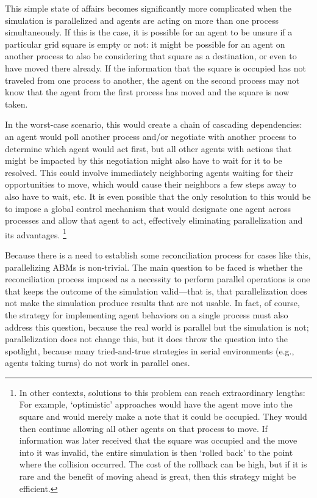 This simple state of affairs becomes significantly more complicated when the simulation is parallelized and agents are acting on more than one process simultaneously. If this is the case, it is possible for an agent to be unsure if a particular grid square is empty or not: it might be possible for an agent on another process to also be considering that square as a destination, or even to have moved there already. If the information that the square is occupied has not traveled from one process to another, the agent on the second process may not know that the agent from the first process has moved and the square is now taken.

In the worst-case scenario, this would create a chain of cascading dependencies: an agent would poll another process and/or negotiate with another process to determine which agent would act first, but all other agents with actions that might be impacted by this negotiation might also have to wait for it to be resolved. This could involve immediately neighboring agents waiting for their opportunities to move, which would cause their neighbors a few steps away to also have to wait, etc. It is even possible that the only resolution to this would be to impose a global control mechanism that would designate one agent across processes and allow that agent to act, effectively eliminating parallelization and its advantages. \footnote{In other contexts, solutions to this problem can reach extraordinary lengths: For example, `optimistic' approaches would have the agent move into the square and would merely make a note that it could be occupied. They would then continue allowing all other agents on that process to move. If information was later received that the square was occupied and the move into it was invalid, the entire simulation is then `rolled back' to the point where the collision occurred. The cost of the rollback can be high, but if it is rare and the benefit of moving ahead is great, then this strategy might be efficient.}

Because there is a need to establish some reconciliation process for cases like this, parallelizing ABMs is non-trivial. The main question to be faced is whether the reconciliation process imposed as a necessity to perform parallel operations is one that keeps the outcome of the simulation valid---that is, that parallelization does not make the simulation produce results that are not usable. In fact, of course, the strategy for implementing agent behaviors on a single process must also address this question, because the real world is parallel but the simulation is not; parallelization does not change this, but it does throw the question into the spotlight, because many tried-and-true strategies in serial environments (e.g., agents taking turns) do not work in parallel ones.

